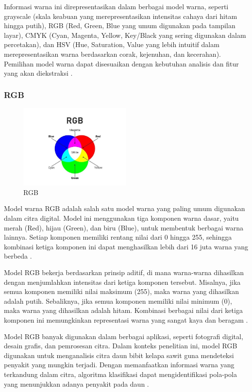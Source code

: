 Informasi warna ini direpresentasikan dalam berbagai model warna, seperti grayscale (skala keabuan yang merepresentasikan intensitas cahaya dari hitam hingga putih), RGB (Red, Green, Blue yang umum digunakan pada tampilan layar), CMYK (Cyan, Magenta, Yellow, Key/Black yang sering digunakan dalam percetakan), dan HSV (Hue, Saturation, Value yang lebih intuitif dalam merepresentasikan warna berdasarkan corak, kejenuhan, dan kecerahan). Pemilihan model warna dapat disesuaikan dengan kebutuhan analisis dan fitur yang akan diekstraksi \cite{saputraperbandingan}.

\subsubsection{RGB} \label{II.RGB}
\begin{figure}[H]
	\centering
	\includegraphics[width=0.5\textwidth]{figure/chapter-2-RGB.jpeg}
	\caption{RGB}
	\label{fig:2.RGB}
\end{figure}

Model warna RGB adalah salah satu model warna yang paling umum digunakan dalam citra digital. Model ini menggunakan tiga komponen warna dasar, yaitu merah (Red), hijau (Green), dan biru (Blue), untuk membentuk berbagai warna lainnya. Setiap komponen memiliki rentang nilai dari 0 hingga 255, sehingga kombinasi ketiga komponen ini dapat menghasilkan lebih dari 16 juta warna yang berbeda \cite{himmah2020identifikasi}.

Model RGB bekerja berdasarkan prinsip aditif, di mana warna-warna dihasilkan dengan menjumlahkan intensitas dari ketiga komponen tersebut. Misalnya, jika semua komponen memiliki nilai maksimum (255), maka warna yang dihasilkan adalah putih. Sebaliknya, jika semua komponen memiliki nilai minimum (0), maka warna yang dihasilkan adalah hitam. Kombinasi berbagai nilai dari ketiga komponen ini memungkinkan representasi warna yang sangat kaya dan beragam \cite{fitriyah2021dasar}.

Model RGB banyak digunakan dalam berbagai aplikasi, seperti fotografi digital, desain grafis, dan pemrosesan citra. Dalam konteks penelitian ini, model RGB digunakan untuk menganalisis citra daun bibit kelapa sawit guna mendeteksi penyakit yang mungkin terjadi. Dengan memanfaatkan informasi warna yang terkandung dalam citra, algoritma klasifikasi dapat mengidentifikasi pola-pola yang menunjukkan adanya penyakit pada daun \cite{nurhadi2024sistem}.

